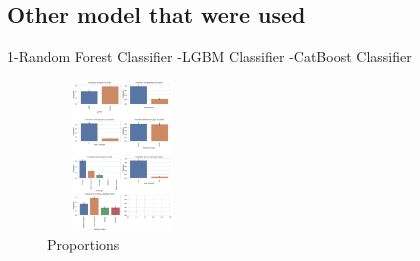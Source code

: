 \documentclass{article}
\begin{document}
\subsection{Other model that were used}
1-Random Forest Classifier 
-LGBM Classifier
-CatBoost Classifier
\newline

\begin{figure}[!htb]
  \centering
  \includegraphics[width =150 ,height =150]{output.png}
  \caption{Proportions}
  \label{Proportions}

\end{figure}
\end{document}
